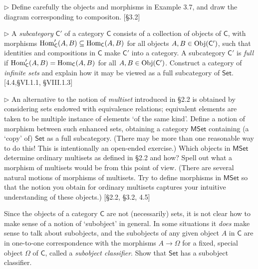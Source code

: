 \begin{problem}
  $\rhd$ Define carefully the objects and morphisms in Example 3.7, and draw
  the diagram corresponding to compositon. [\S 3.2]
\end{problem}

\begin{problem}
  \def \C {\mathsf{C}}
  \def \Cp {\C'}

  $\rhd$ A \textit{subcategory} $\Cp$ of a category $\C$ consists of a
  collection of objects of $\C$, with morphisms $\Hom_\Cp(A,B) \subseteq
  \Hom_\C(A,B)$ for all objects $A,B\in\Obj(\Cp)$, such that identities and
  compositions in $\C$ make $\Cp$ into a category. A subcategory $\Cp$ is
  \textit{full} if $\Hom_\Cp(A,B) = \Hom_\C(A,B)$ for all $A,B\in\Obj(\Cp)$.
  Construct a category of \textit{infinite sets} and explain how it may be
  viewed as a full subcategory of $\mathsf{Set}$. [4.4,\S VI.1.1,
  \S VIII.1.3]
\end{problem}

\begin{problem}
  \def \Set {\mathsf{Set}}
  \def \MSet {\mathsf{MSet}}

  $\rhd$ An alternative to the notion of \textit{multiset} introduced in
  \S2.2 is obtained by considering sets endowed with equivalence relations;
  equivalent elements are taken to be multiple instance of elements `of the
  same kind'. Define a notion of morphism between such enhanced sets,
  obtaining a category $\MSet$ containing (a `copy' of) $\Set$ as a full
  subcategory. (There may be more than one reasonable way to do this!
  This is intentionally an open-ended exercise.) Which objects in $\MSet$
  determine ordinary multisets as defined in \S2.2 and how? Spell out what
  a morphism of multisets would be from this point of view. (There are
  several natural motions of morphisms of multisets. Try to define morphisms
  in $\MSet$ so that the notion you obtain for ordinary multisets captures
  your intuitive understanding of these objects.) [\S2.2, \S3.2, 4.5]
\end{problem}

\begin{problem}
  \def \C {\mathsf{C}}
  \def \Set {\mathsf{Set}}

  Since the objects of a category $\C$ are not (necessarily) sets, it is not
  clear how to make sense of a notion of `subobject' in general. In some
  situations it \textit{does} make sense to talk about subobjects, and the
  subobjects of any given object $A$ in $\C$ are in one-to-one correspondence
  with the morphisms $A\to\Omega$ for a fixed, special object $\Omega$ of
  $\C$, called a \textit{subobject classifier}. Show that $\Set$ has
  a subobject classifier.
\end{problem}

